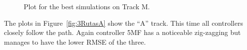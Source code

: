 \documentclass[symmetry,article,submit,moreauthors,pdftex]{Definitions/mdpi}
\begin{document}
\begin{figure}[H]
    \widefigure
     \centering
     \caption{Plot for the best simulations on Track M.}
        \label{fig:3RutasM}
\end{figure}
\begin{paracol}{2}
\linenumbers
\switchcolumn

The plots in Figure~\ref{fig:3RutasA} show the ``A'' track. This time all
controllers closely follow the path. Again controller 5MF has a noticeable
zig-zagging but manages to have the lower RMSE of the three.

\end{paracol}
\end{document}
